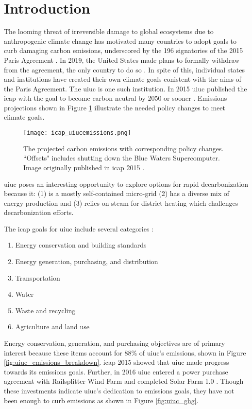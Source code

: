 \section{Introduction}

The looming threat of irreversible damage to global ecosystems due to
anthropogenic climate change has motivated many countries to adopt goals to
curb damaging carbon emissions, underscored by the 196 signatories of the 2015
Paris Agreement \cite{noauthor_paris_nodate}. In 2019, the United States made
plans to formally withdraw from the agreement, the only country to do so
\cite{eshraghi_us_2018}. In spite of
this, individual states and institutions have created their own climate goals
conistent with the aims of the Paris Agreement. The \gls{uiuc} is one such
institution. In 2015 \gls{uiuc} published the \gls{icap} with the goal to
become carbon neutral by 2050 or sooner \cite{isee_illinois_2015}. Emissions
projections shown in Figure \ref{fig:icap_emissions} illustrate the needed
policy changes to meet climate goals.

\begin{figure}[h]
  \centering
  \texttt{[image: icap\_uiucemissions.png]}
  \caption{The projected carbon emissions with corresponding policy changes.
  ``Offsets" includes shutting down the Blue Waters Supercomputer. Image
  originally published in \gls{icap} 2015 \cite{isee_illinois_2015}.}
  \label{fig:icap_emissions}
\end{figure}

\gls{uiuc} poses an interesting opportunity to explore options for rapid
decarbonization because it: (1) is a mostly self-contained micro-grid (2) has a
diverse mix of energy production and (3) relies on steam for district heating
which challenges decarbonization efforts.


The \gls{icap} goals for \gls{uiuc} include several categories
\cite{isee_illinois_2015}:
\begin{enumerate}
  \item Energy conservation and building standards
  \item Energy generation, purchasing, and distribution
  \item Transportation
  \item Water
  \item Waste and recycling
  \item Agriculture and land use
\end{enumerate}

Energy conservation, generation, and purchasing objectives are of primary
interest because these items account for 88\% of \gls{uiuc}'s emissions, shown
in Figure \ref{fig:uiuc_emissions_breakdown}. \gls{icap} 2015 showed that
\gls{uiuc} made progress towards its emissions goals. Further, in 2016
\gls{uiuc} entered a power purchase agreement with Railsplitter Wind Farm
\cite{breitweiser_wind_2016} and completed Solar Farm 1.0
\cite{white_solar_2017}. Though these investments indicate \gls{uiuc}'s dedication to
emissions goals, they have not been enough to curb emissions as shown in Figure
\ref{fig:uiuc_ghg}.

